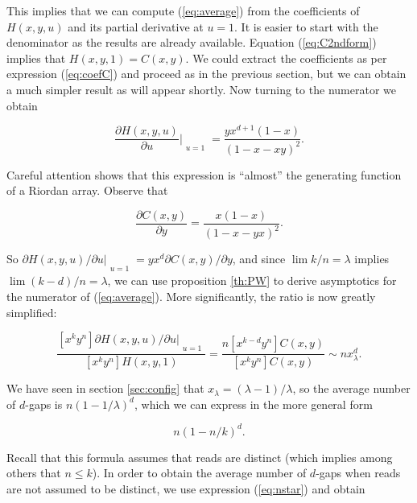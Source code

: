 \documentclass{article}
\begin{document}
This implies that we can compute (\ref{eq:average}) from the coefficients
of $H(x,y,u)$ and its partial derivative at $u=1$. It is easier to start
with the denominator as the results are already available. Equation
(\ref{eq:C2ndform}) implies that $H(x,y,1) = C(x,y)$. We could extract the
coefficients as per expression (\ref{eq:coefC}) and proceed as in the
previous section, but we can obtain a much simpler result as will appear
shortly. Now turning to the numerator we obtain

\begin{equation*}
\frac{\partial H(x,y,u)}{\partial u}\Bigr|_{\substack{\\u=1}}
= \frac{yx^{d+1}(1-x)}{\left(1-x-xy\right)^2}.
\end{equation*}

Careful attention shows that this expression is ``almost'' the generating
function of a Riordan array. Observe that

\begin{equation*}
\frac{\partial C(x,y)}{\partial y} = 
\frac{x(1-x)}{\left(1-x-yx\right)^2}.
\end{equation*}

So $\partial H(x,y,u)/\partial u|_{\substack{\\u=1}} = yx^d\partial
C(x,y)/\partial y$, and since $\lim k/n = \lambda$ implies $\lim (k-d)/n =
\lambda$, we can use proposition \ref{th:PW} to derive asymptotics for the
numerator of (\ref{eq:average}). More significantly, the ratio is now
greatly simplified:

\begin{equation*}
\frac{[x^ky^n] \partial H(x,y,u)/\partial u|_{\substack{\\u=1}}}
{[x^ky^n]H(x,y,1)} =
\frac{n[x^{k-d}y^n]C(x,y)}{[x^ky^n]C(x,y)}
\sim n x_\lambda^d.
\end{equation*}

We have seen in section \ref{sec:config} that $x_\lambda =
(\lambda-1)/\lambda$, so the average number of $d$-gaps is
$n(1-1/\lambda)^d$, which we can express in the more general form

\begin{equation*}
n\left(1-n/k\right)^d.
\end{equation*}

Recall that this formula assumes that reads are distinct (which implies
among others that $n \leq k$). In order to obtain the average number of
$d$-gaps when reads are not assumed to be distinct, we use expression
(\ref{eq:nstar}) and obtain
\end{document}
